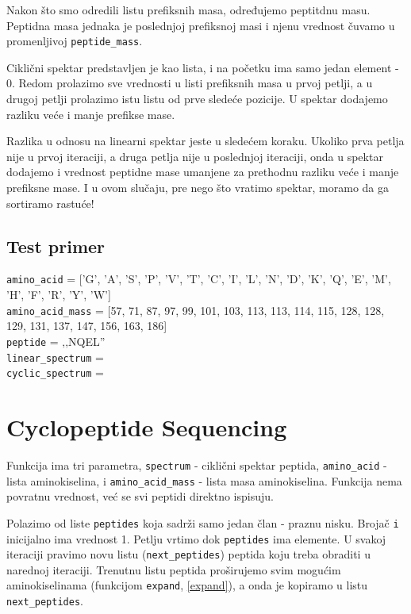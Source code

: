 Nakon što smo odredili listu prefiksnih masa, određujemo peptitdnu masu. Peptidna masa jednaka je poslednjoj prefiksnoj masi i njenu vrednost čuvamo u promenljivoj \texttt{peptide\_mass}.

Ciklični spektar predstavljen je kao lista, i na početku ima samo jedan element - 0. Redom prolazimo sve vrednosti u listi prefiksnih masa u prvoj petlji, a u drugoj petlji prolazimo istu listu od prve sledeće pozicije. U spektar dodajemo razliku veće i manje prefikse mase. 

Razlika u odnosu na linearni spektar jeste u sledećem koraku. Ukoliko prva petlja nije u prvoj iteraciji, a druga petlja nije u poslednjoj iteraciji, onda u spektar dodajemo i vrednost peptidne mase umanjene za prethodnu razliku veće i manje prefiksne mase. I u ovom slučaju, pre nego što vratimo spektar, moramo da ga sortiramo rastuće!




\subsection{Test primer}

\noindent\texttt{amino\_acid} = ['G', 'A', 'S', 'P', 'V', 'T', 'C', 'I', 'L', 'N', 'D', 'K', 'Q', 'E', 'M', 'H', 'F', 'R', 'Y', 'W']
\\
\texttt{amino\_acid\_mass} = [57, 71, 87, 97, 99, 101, 103, 113, 113, 114, 115, 128, 128, 129, 131, 137, 147, 156, 163, 186]
\\
\texttt{peptide} = ‚‚NQEL''
\\\texttt{linear\_spectrum} = 
\\\texttt{cyclic\_spectrum} = 


\section{Cyclopeptide Sequencing}

Funkcija ima tri parametra, \texttt{spectrum} - ciklični spektar peptida, \texttt{amino\_acid} - lista aminokiselina, i \texttt{amino\_acid\_mass} - lista masa aminokiselina. Funkcija nema povratnu vrednost, već se svi peptidi direktno ispisuju.

Polazimo od liste \texttt{peptides} koja sadrži samo jedan član - praznu nisku. Brojač \texttt{i} inicijalno ima vrednost 1. Petlju vrtimo dok \texttt{peptides} ima elemente. U svakoj iteraciji pravimo novu listu (\texttt{next\_peptides}) peptida koju treba obraditi u narednoj iteraciji. Trenutnu listu peptida proširujemo svim mogućim aminokiselinama (funkcijom \texttt{expand}, \ref{expand}), a onda je kopiramo u listu \texttt{next\_peptides}. 

